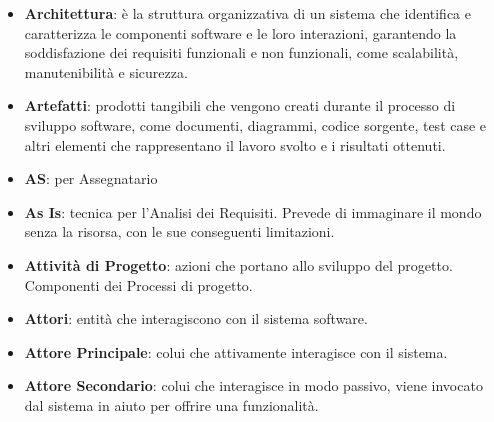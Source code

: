 \documentclass[a4paper,12pt]{article}
\begin{document}
\begin{itemize}
    \item \textbf{Architettura}: è la struttura organizzativa di un sistema che identifica e caratterizza le componenti software e le loro interazioni, garantendo la soddisfazione dei requisiti funzionali e non funzionali, come scalabilità, manutenibilità e sicurezza.
    \item \textbf{Artefatti}: prodotti tangibili che vengono creati durante il processo di sviluppo software, come documenti, diagrammi, codice sorgente, test case e altri elementi che rappresentano il lavoro svolto e i risultati ottenuti.
    \item \textbf{AS}: per Assegnatario
    \item \textbf{As Is}: tecnica per l'Analisi dei Requisiti. Prevede di immaginare il mondo senza la risorsa, con le sue conseguenti limitazioni.
    \item \textbf{Attività di Progetto}: azioni che portano allo sviluppo del progetto. Componenti dei Processi di progetto.
    \item \textbf{Attori}: entità che interagiscono con il sistema software.
    \item \textbf{Attore Principale}: colui che attivamente interagisce con il sistema.
    \item \textbf{Attore Secondario}: colui che interagisce in modo passivo, viene invocato dal sistema in aiuto per offrire una funzionalità.
\end{itemize}
\end{document}
